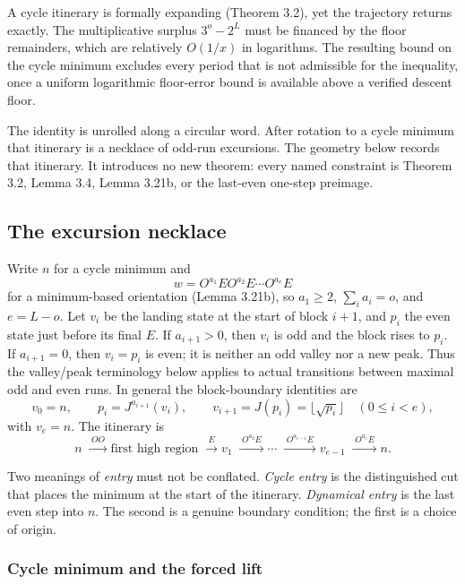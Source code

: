 \documentclass[12pt]{article}
\begin{document}
A cycle itinerary is formally expanding (Theorem 3.2), yet the
trajectory returns exactly. The multiplicative surplus \(3^o-2^L\) must
be financed by the floor remainders, which are relatively \(O(1/x)\) in
logarithms. The resulting bound on the cycle minimum excludes every
period that is not admissible for the inequality, once a uniform
logarithmic floor-error bound is available above a verified descent
floor.

The identity is unrolled along a circular word. After rotation to a
cycle minimum that itinerary is a necklace of odd-run excursions. The
geometry below records that itinerary. It introduces no new theorem:
every named constraint is Theorem 3.2, Lemma 3.4, Lemma 3.21b, or the
last-even one-step preimage.

\subsection{The excursion necklace}\label{the-excursion-necklace}

Write \(n\) for a cycle minimum and \[
w=O^{a_1}EO^{a_2}E\cdots O^{a_e}E
\] for a minimum-based orientation (Lemma 3.21b), so \(a_1\ge 2\),
\(\sum_i a_i=o\), and \(e=L-o\). Let \(v_i\) be the landing state at the
start of block \(i+1\), and \(p_i\) the even state just before its final
\(E\). If \(a_{i+1}>0\), then \(v_i\) is odd and the block rises to
\(p_i\). If \(a_{i+1}=0\), then \(v_i=p_i\) is even; it is neither an
odd valley nor a new peak. Thus the valley/peak terminology below
applies to actual transitions between maximal odd and even runs. In
general the block-boundary identities are \[
v_0=n,\qquad
p_i=J^{a_{i+1}}(v_i),\qquad
v_{i+1}=J(p_i)=\lfloor\sqrt{p_i}\rfloor
\quad(0\le i<e),
\] with \(v_e=n\). The itinerary is \[
n
\;\xrightarrow{\;OO\;}
\text{first high region}
\;\xrightarrow{\;E\;}
v_1
\;\xrightarrow{\;O^{a_2}E\;}
\cdots
\;\xrightarrow{\;O^{a_{e-1}}E\;}
v_{e-1}
\;\xrightarrow{\;O^{a_e}E\;}
n.
\]

Two meanings of \emph{entry} must not be conflated. \emph{Cycle entry}
is the distinguished cut that places the minimum at the start of the
itinerary. \emph{Dynamical entry} is the last even step into \(n\). The
second is a genuine boundary condition; the first is a choice of origin.

\subsubsection{Cycle minimum and the forced
lift}\label{cycle-minimum-and-the-forced-lift}
\end{document}
